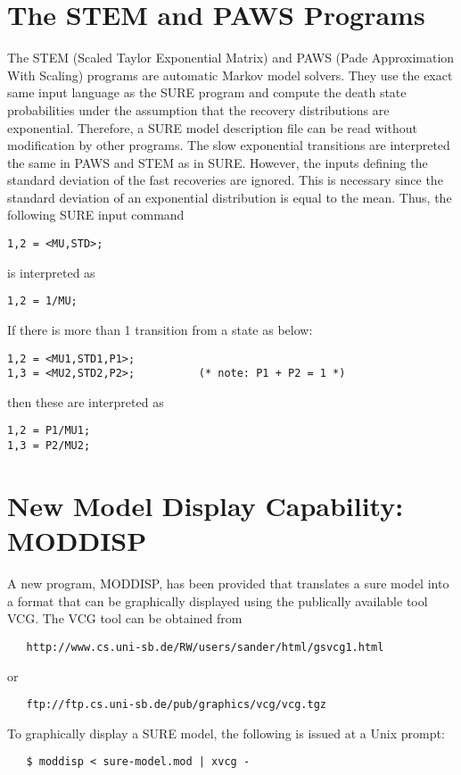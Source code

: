 \section{The STEM and PAWS Programs}
                           
 
The STEM (Scaled Taylor Exponential Matrix) and PAWS (Pade
Approximation With Scaling) programs are automatic Markov model
solvers.  They use the exact same input language as the SURE program
and compute the death state probabilities under the assumption that
the recovery distributions are exponential.  Therefore, a SURE model
description file can be read without modification by other programs.
The slow exponential transitions are interpreted the same in PAWS and
STEM as in SURE.  However, the inputs defining the standard deviation
of the fast recoveries are ignored.  This is necessary since the
standard deviation of an exponential distribution is equal to the
mean.  Thus, the following SURE input command
\begin{verbatim} 
1,2 = <MU,STD>;
\end{verbatim} 
is interpreted as
\begin{verbatim}  
1,2 = 1/MU;
\end{verbatim}  
If there is more than 1 transition from a state as below:
\begin{verbatim}  
1,2 = <MU1,STD1,P1>;
1,3 = <MU2,STD2,P2>;          (* note: P1 + P2 = 1 *)
\end{verbatim}  
then these are interpreted as
\begin{verbatim}  
1,2 = P1/MU1;
1,3 = P2/MU2; 
\end{verbatim}  


\section{New Model Display Capability: MODDISP}

A new program, MODDISP, has been provided that translates a sure model into a
format that can be graphically displayed using the publically available tool VCG.
The VCG tool can be obtained from
\begin{verbatim}
   http://www.cs.uni-sb.de/RW/users/sander/html/gsvcg1.html
\end{verbatim}
or     
\begin{verbatim}
   ftp://ftp.cs.uni-sb.de/pub/graphics/vcg/vcg.tgz
\end{verbatim}
To graphically display a SURE model, the following is issued at a Unix prompt:
\begin{verbatim}
   $ moddisp < sure-model.mod | xvcg -
\end{verbatim}

